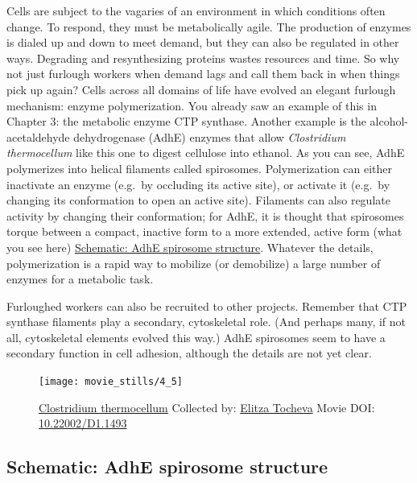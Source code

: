 \documentclass[]{tufte-book}
\begin{document}
Cells are subject to the vagaries of an environment in which conditions
often change. To respond, they must be metabolically agile. The
production of enzymes is dialed up and down to meet demand, but they can
also be regulated in other ways. Degrading and resynthesizing proteins
wastes resources and time. So why not just furlough workers when demand
lags and call them back in when things pick up again? Cells across all
domains of life have evolved an elegant furlough mechanism: enzyme
polymerization. You already saw an example of this in Chapter 3: the
metabolic enzyme CTP synthase. Another example is the
alcohol-acetaldehyde dehydrogenase (AdhE) enzymes that allow
\emph{Clostridium thermocellum} like this one to digest cellulose into
ethanol. As you can see, AdhE polymerizes into helical filaments called
spirosomes. Polymerization can either inactivate an enzyme (e.g.~by
occluding its active site), or activate it (e.g.~by changing its
conformation to open an active site). Filaments can also regulate
activity by changing their conformation; for AdhE, it is thought that
spirosomes torque between a compact, inactive form to a more extended,
active form (what you see here)
\protect\hyperlink{AdhE_spirosome_structure}{Schematic: AdhE spirosome
structure}. Whatever the details, polymerization is a rapid way to
mobilize (or demobilize) a large number of enzymes for a metabolic task.

Furloughed workers can also be recruited to other projects. Remember
that CTP synthase filaments play a secondary, cytoskeletal role. (And
perhaps many, if not all, cytoskeletal elements evolved this way.) AdhE
spirosomes seem to have a secondary function in cell adhesion, although
the details are not yet clear.





\begin{figure}
\texttt{[image: movie\_stills/4\_5]} \caption[\protect\hyperlink{tree}{Clostridium thermocellum} Collected
by: \protect\hyperlink{elitza_tocheva}{Elitza Tocheva} Movie DOI:
\href{https://doi.org/10.22002/D1.1493}{10.22002/D1.1493}]{\protect\hyperlink{tree}{Clostridium thermocellum} Collected
by: \protect\hyperlink{elitza_tocheva}{Elitza Tocheva} Movie DOI:
\href{https://doi.org/10.22002/D1.1493}{10.22002/D1.1493}}\label{fig:4-5}
\end{figure}

\hypertarget{AdhE_spirosome_structure}{\subsection*{Schematic: AdhE
spirosome structure}\label{AdhE_spirosome_structure}}
\end{document}
